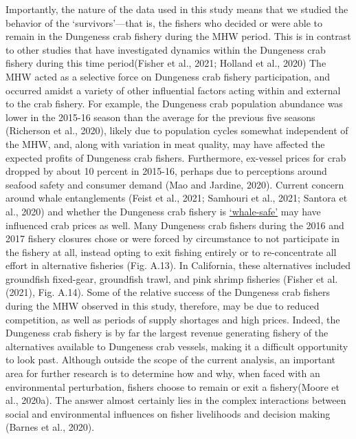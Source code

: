 \documentclass[]{elsarticle} %
\begin{document}
Importantly, the nature of the data used in this study means that we
studied the behavior of the `survivors'---that is, the fishers who
decided or were able to remain in the Dungeness crab fishery during the
MHW period. This is in contrast to other studies that have investigated
dynamics within the Dungeness crab fishery during this time
period(Fisher et al., 2021; Holland et al., 2020) The MHW acted as a
selective force on Dungeness crab fishery participation, and occurred
amidst a variety of other influential factors acting within and external
to the crab fishery. For example, the Dungeness crab population
abundance was lower in the 2015-16 season than the average for the
previous five seasons (Richerson et al., 2020), likely due to population
cycles somewhat independent of the MHW, and, along with variation in
meat quality, may have affected the expected profits of Dungeness crab
fishers. Furthermore, ex-vessel prices for crab dropped by about 10
percent in 2015-16, perhaps due to perceptions around seafood safety and
consumer demand (Mao and Jardine, 2020). Current concern around whale
entanglements (Feist et al., 2021; Samhouri et al., 2021; Santora et
al., 2020) and whether the Dungeness crab fishery is
\href{https://wildlife.ca.gov/Conservation/Marine/Whale-Safe-Fisheries}{`whale-safe'}
may have influenced crab prices as well. Many Dungeness crab fishers
during the 2016 and 2017 fishery closures chose or were forced by
circumstance to not participate in the fishery at all, instead opting to
exit fishing entirely or to re-concentrate all effort in alternative
fisheries (Fig. A.13). In California, these alternatives included
groundfish fixed-gear, groundfish trawl, and pink shrimp fisheries
(Fisher et al. (2021), Fig. A.14). Some of the relative success of the
Dungeness crab fishers during the MHW observed in this study, therefore,
may be due to reduced competition, as well as periods of supply
shortages and high prices. Indeed, the Dungeness crab fishery is by far
the largest revenue generating fishery of the alternatives available to
Dungeness crab vessels, making it a difficult opportunity to look past.
Although outside the scope of the current analysis, an important area
for further research is to determine how and why, when faced with an
environmental perturbation, fishers choose to remain or exit a
fishery(Moore et al., 2020a). The answer almost certainly lies in the
complex interactions between social and environmental influences on
fisher livelihoods and decision making (Barnes et al., 2020).
\end{document}
